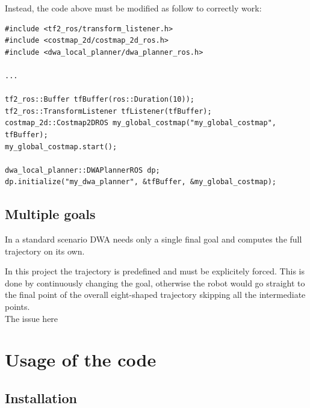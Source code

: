 \documentclass[11pt,a4paper]{article}
\begin{document}
Instead, the code above must be modified as follow to correctly work:

\begin{lstlisting}
#include <tf2_ros/transform_listener.h>
#include <costmap_2d/costmap_2d_ros.h>
#include <dwa_local_planner/dwa_planner_ros.h>

...

tf2_ros::Buffer tfBuffer(ros::Duration(10));
tf2_ros::TransformListener tfListener(tfBuffer);
costmap_2d::Costmap2DROS my_global_costmap("my_global_costmap", tfBuffer);
my_global_costmap.start();

dwa_local_planner::DWAPlannerROS dp;
dp.initialize("my_dwa_planner", &tfBuffer, &my_global_costmap);
\end{lstlisting}



\subsection{Multiple goals}

In a standard scenario DWA needs only a single final goal and computes the full trajectory on its own.

In this project the trajectory is predefined and must be explicitely forced.
This is done by continuously changing the goal, otherwise the robot would go straight to the final
point of the overall eight-shaped trajectory skipping all the intermediate points.\\

The issue here





\section{Usage of the code}



\subsection{Installation}
\end{document}
